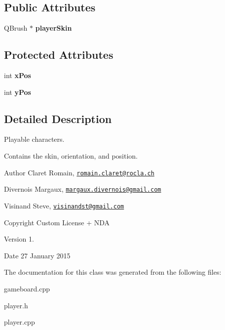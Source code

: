 \subsection*{Public Attributes}
\begin{DoxyCompactItemize}
\item 
\hypertarget{class_player_af645259dc442f5e32e7cd46d5b48ed7f}{}Q\+Brush $\ast$ {\bfseries player\+Skin}\label{class_player_af645259dc442f5e32e7cd46d5b48ed7f}

\end{DoxyCompactItemize}
\subsection*{Protected Attributes}
\begin{DoxyCompactItemize}
\item 
\hypertarget{class_player_aa3c4b095965da25dba3e777122082773}{}int {\bfseries x\+Pos}\label{class_player_aa3c4b095965da25dba3e777122082773}

\item 
\hypertarget{class_player_a0a14d018fcc4b1ad121dce82524d3c96}{}int {\bfseries y\+Pos}\label{class_player_a0a14d018fcc4b1ad121dce82524d3c96}

\end{DoxyCompactItemize}


\subsection{Detailed Description}
Playable characters. 

Contains the skin, orientation, and position. \begin{DoxyAuthor}{Author}
Claret Romain, \href{mailto:romain.claret@rocla.ch}{\tt romain.\+claret@rocla.\+ch} 

Divernois Margaux, \href{mailto:margaux.divernois@gmail.com}{\tt margaux.\+divernois@gmail.\+com} 

Visinand Steve, \href{mailto:visinandst@gmail.com}{\tt visinandst@gmail.\+com} 
\end{DoxyAuthor}
\begin{DoxyCopyright}{Copyright}
Custom License + N\+D\+A 
\end{DoxyCopyright}
\begin{DoxyVersion}{Version}
1. 
\end{DoxyVersion}
\begin{DoxyDate}{Date}
27 January 2015 
\end{DoxyDate}


The documentation for this class was generated from the following files\+:\begin{DoxyCompactItemize}
\item 
gameboard.\+cpp\item 
player.\+h\item 
player.\+cpp\end{DoxyCompactItemize}
